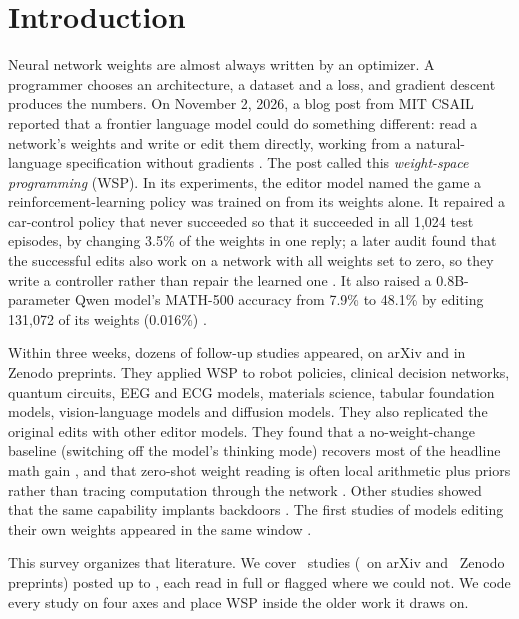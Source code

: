 \section{Introduction}
\label{sec:intro}

Neural network weights are almost always written by an optimizer. A programmer chooses an architecture, a dataset and a loss, and gradient descent produces the numbers. On November 2, 2026, a blog post from MIT CSAIL reported that a frontier language model could do something different: read a network's weights and write or edit them directly, working from a natural-language specification without gradients \citep{takehi2026sparks}. The post called this \emph{weight-space programming} (WSP). In its experiments, the editor model named the game a reinforcement-learning policy was trained on from its weights alone. It repaired a car-control policy that never succeeded so that it succeeded in all 1{,}024 test episodes, by changing 3.5\% of the weights in one reply; a later audit found that the successful edits also work on a network with all weights set to zero, so they write a controller rather than repair the learned one \citep{zen24373915}. It also raised a 0.8B-parameter Qwen model's MATH-500 accuracy from 7.9\% to 48.1\% by editing 131{,}072 of its weights (0.016\%) \citep{takehi2026sparks}.

Within three weeks, dozens of follow-up studies appeared, on arXiv and in Zenodo preprints. They applied WSP to robot policies, clinical decision networks, quantum circuits, EEG and ECG models, materials science, tabular foundation models, vision-language models and diffusion models. They also replicated the original edits with other editor models. They found that a no-weight-change baseline (switching off the model's thinking mode) recovers most of the headline math gain \citep{turkoglu2026survey}, and that zero-shot weight reading is often local arithmetic plus priors rather than tracing computation through the network \citep{ax2611_08070}. Other studies showed that the same capability implants backdoors \citep{ax2611_17395,ax2611_27425,ax2611_27920}. The first studies of models editing their own weights appeared in the same window \citep{ax2611_21885,ax2611_28833,ax2611_29513}.

This survey organizes that literature. We cover \nIncluded\ studies (\nArxiv\ on arXiv and \nZenodo\ Zenodo preprints) posted up to \cutoffdate, each read in full or flagged where we could not. We code every study on four axes and place WSP inside the older work it draws on.

